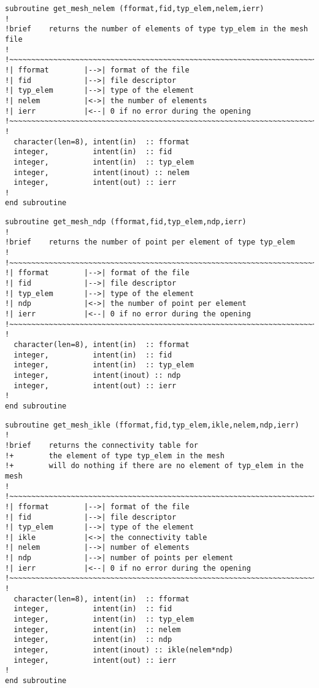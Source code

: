 %
\begin{lstlisting}
subroutine get_mesh_nelem (fformat,fid,typ_elem,nelem,ierr)
!
!brief    returns the number of elements of type typ_elem in the mesh file
!
!~~~~~~~~~~~~~~~~~~~~~~~~~~~~~~~~~~~~~~~~~~~~~~~~~~~~~~~~~~~~~~~~~~~~~~~
!| fformat        |-->| format of the file
!| fid            |-->| file descriptor
!| typ_elem       |-->| type of the element
!| nelem          |<->| the number of elements
!| ierr           |<--| 0 if no error during the opening
!~~~~~~~~~~~~~~~~~~~~~~~~~~~~~~~~~~~~~~~~~~~~~~~~~~~~~~~~~~~~~~~~~~~~~~~
!
  character(len=8), intent(in)  :: fformat
  integer,          intent(in)  :: fid
  integer,          intent(in)  :: typ_elem
  integer,          intent(inout) :: nelem
  integer,          intent(out) :: ierr
!
end subroutine
\end{lstlisting}
%
\begin{lstlisting}
subroutine get_mesh_ndp (fformat,fid,typ_elem,ndp,ierr)
!
!brief    returns the number of point per element of type typ_elem
!
!~~~~~~~~~~~~~~~~~~~~~~~~~~~~~~~~~~~~~~~~~~~~~~~~~~~~~~~~~~~~~~~~~~~~~~~
!| fformat        |-->| format of the file
!| fid            |-->| file descriptor
!| typ_elem       |-->| type of the element
!| ndp            |<->| the number of point per element
!| ierr           |<--| 0 if no error during the opening
!~~~~~~~~~~~~~~~~~~~~~~~~~~~~~~~~~~~~~~~~~~~~~~~~~~~~~~~~~~~~~~~~~~~~~~~
!
  character(len=8), intent(in)  :: fformat
  integer,          intent(in)  :: fid
  integer,          intent(in)  :: typ_elem
  integer,          intent(inout) :: ndp
  integer,          intent(out) :: ierr
!
end subroutine
\end{lstlisting}
%
\begin{lstlisting}
subroutine get_mesh_ikle (fformat,fid,typ_elem,ikle,nelem,ndp,ierr)
!
!brief    returns the connectivity table for
!+        the element of type typ_elem in the mesh
!+        will do nothing if there are no element of typ_elem in the mesh
!
!~~~~~~~~~~~~~~~~~~~~~~~~~~~~~~~~~~~~~~~~~~~~~~~~~~~~~~~~~~~~~~~~~~~~~~~
!| fformat        |-->| format of the file
!| fid            |-->| file descriptor
!| typ_elem       |-->| type of the element
!| ikle           |<->| the connectivity table
!| nelem          |-->| number of elements
!| ndp            |-->| number of points per element
!| ierr           |<--| 0 if no error during the opening
!~~~~~~~~~~~~~~~~~~~~~~~~~~~~~~~~~~~~~~~~~~~~~~~~~~~~~~~~~~~~~~~~~~~~~~~
!
  character(len=8), intent(in)  :: fformat
  integer,          intent(in)  :: fid
  integer,          intent(in)  :: typ_elem
  integer,          intent(in)  :: nelem
  integer,          intent(in)  :: ndp
  integer,          intent(inout) :: ikle(nelem*ndp)
  integer,          intent(out) :: ierr
!
end subroutine
\end{lstlisting}
